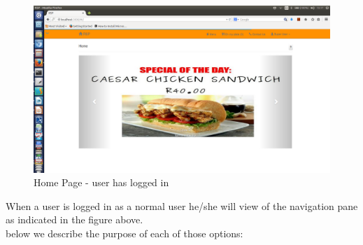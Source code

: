 \documentclass[a4paper,12pt]{report}
\begin{document}
\begin{figure}[H]
  \centering
    \includegraphics[width=1.0\textwidth]{screenshots/sign/homepage2.png}
    \caption{Home Page - user has logged in } 
\end{figure}


When a user is logged in as a normal user he/she will view of the navigation pane as indicated in the figure above.\\ below we describe the purpose of each of those options: \\
\end{document}
